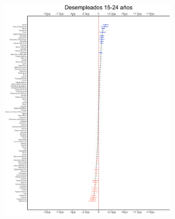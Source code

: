 \begin{figure}
	\centering
	\begin{subfigure}{0.3\textwidth}
	\includegraphics[width = \textwidth]{Figs/Efectos/Efectos_Des1_Modelo_H}
	\end{subfigure}
	~
	\begin{subfigure}{0.3\textwidth}

\end{subfigure}
\end{figure}
